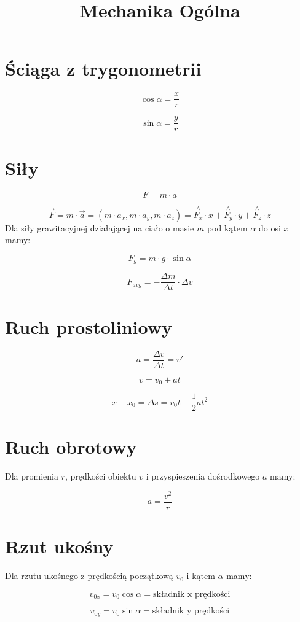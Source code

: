 \documentclass{../notatki}
\title{Mechanika Ogólna}
\begin{document}
\tableofcontents

\section{Ściąga z trygonometrii}

$$
\cos \alpha = \frac{x}{r}
$$

$$
\sin \alpha = \frac{y}{r}
$$

\section{Siły}

$$
F = m \cdot a
$$

$$
\vec{F} = m \cdot \vec{a} = (m \cdot a_x, m \cdot a_y, m \cdot a_z) =
\stackrel{\wedge}{F_x} \cdot x + \stackrel{\wedge}{F_y} \cdot y +
\stackrel{\wedge}{F_z} \cdot z
$$
Dla siły grawitacyjnej działającej na ciało o masie $m$ pod kątem
$\alpha$ do osi $x$ mamy:

$$
F_g = m \cdot g \cdot \sin \alpha
$$

$$
F_{avg} = -\frac{\Delta m}{\Delta t} \cdot \Delta v
$$

\section{Ruch prostoliniowy}

$$
a = \frac{\Delta v}{\Delta t} = v'
$$

$$
v = v_0 + at
$$

$$
x - x_0 = \Delta s = v_0t + \frac{1}{2}a t^2
$$

\section{Ruch obrotowy}

Dla promienia $r$, prędkości obiektu $v$ i przyspieszenia dośrodkowego $a$ mamy:

$$
a = \frac{v^2}{r}
$$

\section{Rzut ukośny}

Dla rzutu ukośnego z prędkością początkową $v_0$ i kątem $\alpha$ mamy:

$$
v_{0x} = v_0 \cos \alpha = \text{składnik x prędkości}
$$

$$
v_{0y} = v_0 \sin \alpha = \text{składnik y prędkości}
$$
\end{document}
